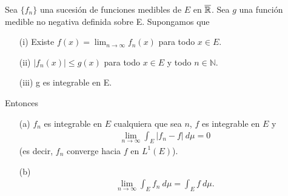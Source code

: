 \begin{teo}
Sea $\{f_n\}$ una sucesión de funciones medibles de $E$ en $\overline{\mathbb{R}}$. Sea $g$ una función medible no negativa definida sobre E. Supongamos que
\begin{enumerate}
    \item[(i)] Existe $f(x) = \lim_{n \to \infty}{f_n(x)}$ para todo $x \in E$.
    \item[(ii)] $|f_n(x)| \leq g(x)$ para todo $x \in E$ y todo $n \in \mathbb{N}$.
    \item[(iii)] g es integrable en E.
\end{enumerate}
Entonces
\begin{enumerate}
    \item[(a)] $f_n$ es integrable en $E$ cualquiera que sea $n$, $f$ es integrable en $E$ y
    \begin{align*}
        \lim_{n \to \infty}{\int_{E}{|f_n - f| \ d\mu}} = 0
    \end{align*}
    (es decir, $f_n$ converge hacia $f$ en $L^1(E)$).
    \item[(b)] 
    \begin{align*}
        \lim_{n \to \infty}{\int_{E}{f_n \ d\mu}} = \int_{E}{f \ d\mu}.
    \end{align*}
\end{enumerate}
\end{teo}

